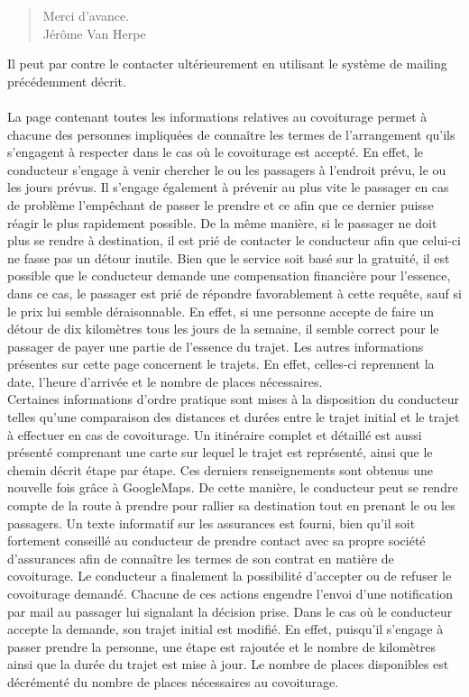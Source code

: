 \documentclass[12pt, a4paper, oneside]{article}
\begin{document}
{{\begin{quote}
            Merci d'avance.\\
            Jérôme Van Herpe
        \end{quote}
        Il peut par contre le contacter ultérieurement en utilisant le système de mailing précédemment décrit.\\\\
        \indent La page contenant toutes les informations relatives au covoiturage permet à chacune des personnes impliquées de connaître les termes de l'arrangement qu'ils s'engagent à respecter dans le cas où le covoiturage est accepté. En effet, le conducteur s'engage à venir chercher le ou les passagers à l'endroit prévu, le ou les jours prévus. Il s'engage également à prévenir au plus vite le passager en cas de problème l'empêchant de passer le prendre et ce afin que ce dernier puisse réagir le plus rapidement possible. De la même manière, si le passager ne doit plus se rendre à destination, il est prié de contacter le conducteur afin que celui-ci ne fasse pas un détour inutile. Bien que le service soit basé sur la gratuité, il est possible que le conducteur demande une compensation financière pour l'essence, dans ce cas, le passager est prié de répondre favorablement à cette requête, sauf si le prix lui semble déraisonnable. En effet, si une personne accepte de faire un détour de dix kilomètres tous les jours de la semaine, il semble correct pour le passager de payer une partie de l'essence du trajet. Les autres informations présentes sur cette page concernent le trajets. En effet, celles-ci reprennent la date, l'heure d'arrivée et le nombre de places nécessaires. \\
        \indent Certaines informations d'ordre pratique sont mises à la disposition du conducteur telles qu'une comparaison des distances et durées entre le trajet initial et le trajet à effectuer en cas de covoiturage. Un itinéraire complet et détaillé est aussi présenté comprenant une carte sur lequel le trajet est représenté, ainsi que le chemin décrit étape par étape. Ces derniers renseignements sont obtenus une nouvelle fois grâce à GoogleMaps. De cette manière, le conducteur peut se rendre compte de la route à prendre pour rallier sa destination tout en prenant le ou les passagers. Un texte informatif sur les assurances est fourni, bien qu'il soit fortement conseillé au conducteur de prendre contact avec sa propre société d'assurances afin de connaître les termes de son contrat en matière de covoiturage. Le conducteur a finalement la possibilité d'accepter ou de refuser le covoiturage demandé. Chacune de ces actions engendre l'envoi d'une notification par mail au passager lui signalant la décision prise. Dans le cas où le conducteur accepte la demande, son trajet initial est modifié. En effet, puisqu'il s'engage à passer prendre la personne, une étape est rajoutée et le nombre de kilomètres ainsi que la durée du trajet est mise à jour. Le nombre de places disponibles est décrémenté du nombre de places nécessaires au covoiturage.\\
}}
\end{document}
